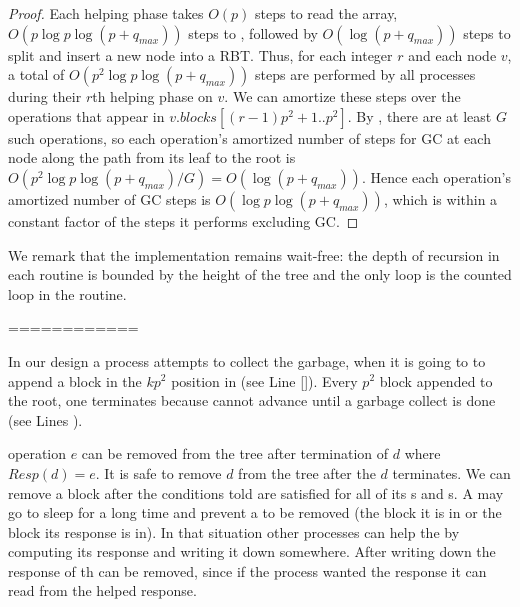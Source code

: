 \begin{proof}
Each helping phase takes $O(p)$ steps to read the  array,
$O(p \log p \log(p+q_{max}))$ steps to ,
followed by $O(\log(p+q_{max}))$ steps to split and insert a new node into a RBT.
Thus, for each integer $r$ and each node $v$, a total of $O(p^2\log p\log(p+q_{max}))$ steps
are performed by all processes during their $r$th helping phase on $v$.
We can amortize these steps over the operations that appear in 
$v.blocks[(r-1)p^2+1..p^2]$.
By , there are at least $G$ such operations, 
so each operation's amortized number of steps for GC at each node along the path from its leaf to the root
is $O(p^2\log p\log(p+q_{max})/G)=O(\log(p+q_{max}))$.
Hence each operation's amortized number of GC steps is $O(\log p\log(p+q_{max}))$, which is
within a constant factor of the steps it performs excluding GC.
\end{proof}

We remark that the implementation remains wait-free:  the depth of recursion in each routine is  bounded
by the height of the tree and the only loop is the counted loop in the  routine.

============

In our design a process attempts to collect the garbage, when it is going to to append a block in the $kp^2$ position in  (see Line \ref{}). Every $p^2$  block appended to the root, one  terminates because  cannot advance until a  garbage collect is done (see Lines ).

%

 operation $e$ can be removed from the tree after termination of  $d$ where $Resp(d)=e$. It is safe to remove  $d$ from the tree after the $d$ terminates. We can remove a block after the conditions told are satisfied for all of its s and s. A  may go to sleep for a long time and prevent a  to be removed (the block it is in or the block its response is in). In that situation other processes can help the  by computing its response and writing it down somewhere. After writing down the response of th  can be removed, since if the process wanted the response it can read from the helped response.

